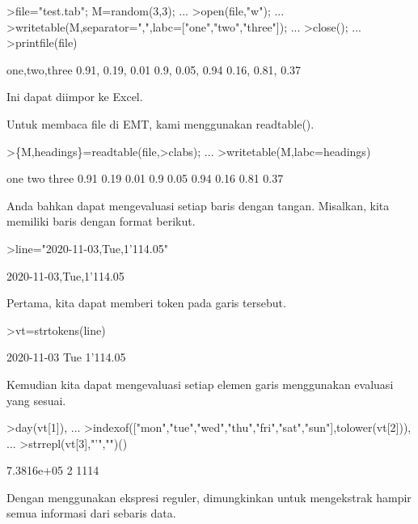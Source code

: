 \documentclass[a4paper,10pt]{article}
\begin{document}
\begin{eulernotebook}
\begin{eulercomment}
\begin{eulercomment}
\begin{eulerprompt}
>file="test.tab"; M=random(3,3);  ...
>open(file,"w");  ...
>writetable(M,separator=",",labc=["one","two","three"]);  ...
>close(); ...
>printfile(file)
\end{eulerprompt}
\begin{euleroutput}
  one,two,three
        0.91,      0.19,      0.01
         0.9,      0.05,      0.94
        0.16,      0.81,      0.37
\end{euleroutput}
\begin{eulercomment}
Ini dapat diimpor ke Excel.

Untuk membaca file di EMT, kami menggunakan readtable().
\end{eulercomment}
\begin{eulerprompt}
>\{M,headings\}=readtable(file,>clabs); ...
>writetable(M,labc=headings)
\end{eulerprompt}
\begin{euleroutput}
         one       two     three
        0.91      0.19      0.01
         0.9      0.05      0.94
        0.16      0.81      0.37
\end{euleroutput}
\begin{eulercomment}
Anda bahkan dapat mengevaluasi setiap baris dengan tangan. Misalkan,
kita memiliki baris dengan format berikut.
\end{eulercomment}
\begin{eulerprompt}
>line="2020-11-03,Tue,1'114.05"
\end{eulerprompt}
\begin{euleroutput}
  2020-11-03,Tue,1'114.05
\end{euleroutput}
\begin{eulercomment}
Pertama, kita dapat memberi token pada garis tersebut.
\end{eulercomment}
\begin{eulerprompt}
>vt=strtokens(line)
\end{eulerprompt}
\begin{euleroutput}
  2020-11-03
  Tue
  1'114.05
\end{euleroutput}
\begin{eulercomment}
Kemudian kita dapat mengevaluasi setiap elemen garis menggunakan
evaluasi yang sesuai.
\end{eulercomment}
\begin{eulerprompt}
>day(vt[1]),  ...
>indexof(["mon","tue","wed","thu","fri","sat","sun"],tolower(vt[2])),  ...
>strrepl(vt[3],"'","")()
\end{eulerprompt}
\begin{euleroutput}
  7.3816e+05
  2
  1114
\end{euleroutput}
\begin{eulercomment}
Dengan menggunakan ekspresi reguler, dimungkinkan untuk mengekstrak
hampir semua informasi dari sebaris data.


\end{eulercomment}
\end{eulercomment}
\end{eulercomment}
\end{eulernotebook}
\end{document}
